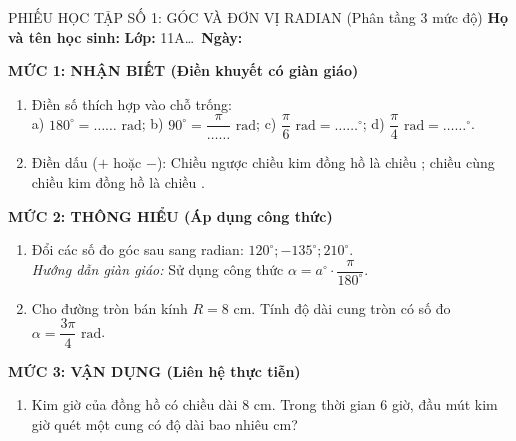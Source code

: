 \documentclass[12pt, a4paper]{article}
\begin{document}
\begin{pedabox}{PHIẾU HỌC TẬP SỐ 1: GÓC VÀ ĐƠN VỊ RADIAN (Phân tầng 3 mức độ)}
\textbf{Họ và tên học sinh:} \dotfill \textbf{Lớp:} 11A\dots \ \textbf{Ngày:} \dotfill

\textbf{MỨC 1: NHẬN BIẾT (Điền khuyết có giàn giáo)}
\begin{enumerate}[leftmargin=0.5cm]
    \item Điền số thích hợp vào chỗ trống:\\
    a) $180^\circ = \dots\dots \text{ rad}$; \quad b) $90^\circ = \dfrac{\pi}{\dots\dots} \text{ rad}$; \quad c) $\dfrac{\pi}{6} \text{ rad} = \dots\dots^\circ$; \quad d) $\dfrac{\pi}{4} \text{ rad} = \dots\dots^\circ$.
    \item Điền dấu ($+$ hoặc $-$): Chiều ngược chiều kim đồng hồ là chiều \dotfill; chiều cùng chiều kim đồng hồ là chiều \dotfill.
\end{enumerate}

\textbf{MỨC 2: THÔNG HIỂU (Áp dụng công thức)}
\begin{enumerate}[leftmargin=0.5cm]
    \item Đổi các số đo góc sau sang radian: $120^\circ; -135^\circ; 210^\circ$.\\
    \textit{Hướng dẫn giàn giáo:} Sử dụng công thức $\alpha = a^\circ \cdot \dfrac{\pi}{180^\circ}$.
    \item Cho đường tròn bán kính $R = 8\text{ cm}$. Tính độ dài cung tròn có số đo $\alpha = \dfrac{3\pi}{4}\text{ rad}$.
\end{enumerate}

\textbf{MỨC 3: VẬN DỤNG (Liên hệ thực tiễn)}
\begin{enumerate}[leftmargin=0.5cm]
    \item Kim giờ của đồng hồ có chiều dài $8\text{ cm}$. Trong thời gian 6 giờ, đầu mút kim giờ quét một cung có độ dài bao nhiêu cm?
\end{enumerate}
\end{pedabox}

\vspace{5pt}
\end{document}
